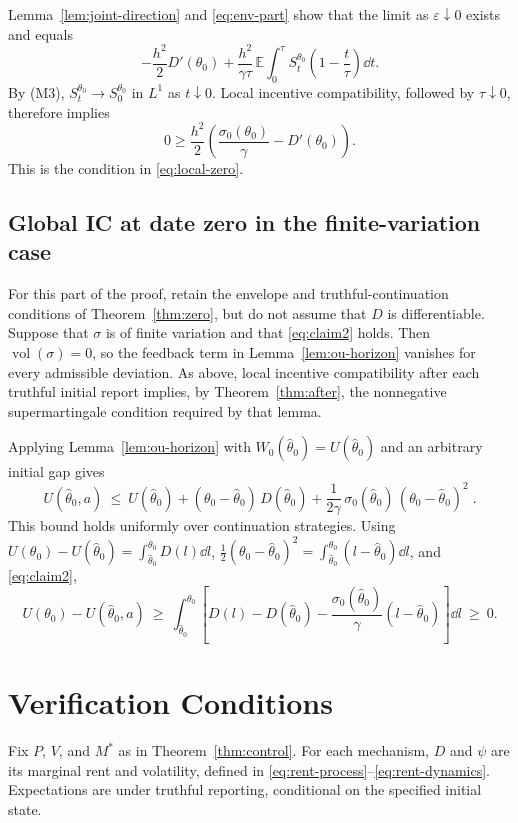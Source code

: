 \documentclass[12pt]{article}
\DeclareMathOperator{\vol}{vol}
\newcommand{\hth}{\hat\theta}
\begin{document}
Lemma~\ref{lem:joint-direction} and \eqref{eq:env-part} show that the limit
as \(\varepsilon\downarrow0\) exists and equals
\[
  -\frac{h^2}{2}D'(\theta_0)
  +\frac{h^2}{\gamma\tau}\,
   \mathbb E\int_0^\tau S_t^{\theta_0}
   \left(1-\frac{t}{\tau}\right)\dd t .
\]
By (M3), \(S_t^{\theta_0}\to S_0^{\theta_0}\) in \(L^1\) as
\(t\downarrow0\). Local incentive compatibility, followed by
\(\tau\downarrow0\), therefore implies
\[
  0\ge
  \frac{h^2}{2}
  \left(\frac{\sigma_0(\theta_0)}{\gamma}
        -D'(\theta_0)\right).
\]
This is the condition in \eqref{eq:local-zero}.

\subsection{Global IC at date zero in the finite-variation case}
\label{sub:zero-global}

For this part of the proof, retain the envelope and truthful-continuation
conditions of Theorem~\ref{thm:zero}, but do not assume that \(D\) is
differentiable. Suppose that \(\sigma\) is of finite variation and that
\eqref{eq:claim2} holds. Then
\(\vol(\sigma)=0\), so the feedback term in
Lemma~\ref{lem:ou-horizon} vanishes for every
admissible deviation. As above, local incentive compatibility after each truthful initial
report implies, by Theorem~\ref{thm:after}, the nonnegative
supermartingale condition required by that lemma.


Applying Lemma~\ref{lem:ou-horizon} with
\(W_0(\hth_0)=U(\hth_0)\) and an arbitrary initial gap gives
\begin{equation}\label{eq:claim2-bound}
U(\hth_0,a)\ \le\ U(\hth_0)+(\theta_0-\hth_0)\,D(\hth_0)
+\frac{1}{2\gamma}\,\sigma_0(\hth_0)\,(\theta_0-\hth_0)^{2}
\;.
\end{equation}
This bound holds uniformly over continuation strategies. Using
$U(\theta_0)-U(\hth_0)=\int_{\hth_0}^{\theta_0}D(l)\dd l$,
$\tfrac12(\theta_0-\hth_0)^{2}=\int_{\hth_0}^{\theta_0}(l-\hth_0)\dd l$, and \eqref{eq:claim2},
\[
U(\theta_0)-U(\hth_0,a)\ \ge\
\int_{\hth_0}^{\theta_0}
\left[D(l)-D(\hth_0)
-\frac{\sigma_0(\hth_0)}{\gamma}(l-\hth_0)\right]\dd l
\ \ge\ 0.
\]

\section{Verification Conditions}
\label{app:verification}

Fix \(P\), \(V\), and \(M^*\) as in Theorem~\ref{thm:control}.
For each mechanism, \(D\) and \(\psi\) are its marginal rent and
volatility, defined in
\eqref{eq:rent-process}--\eqref{eq:rent-dynamics}.
Expectations are under truthful reporting, conditional on the
specified initial state.
\end{document}
